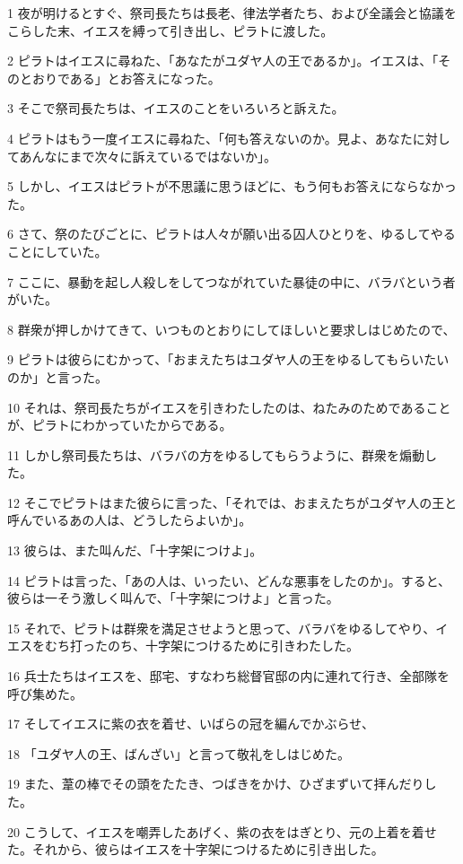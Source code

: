 \par 1 夜が明けるとすぐ、祭司長たちは長老、律法学者たち、および全議会と協議をこらした末、イエスを縛って引き出し、ピラトに渡した。
\par 2 ピラトはイエスに尋ねた、「あなたがユダヤ人の王であるか」。イエスは、「そのとおりである」とお答えになった。
\par 3 そこで祭司長たちは、イエスのことをいろいろと訴えた。
\par 4 ピラトはもう一度イエスに尋ねた、「何も答えないのか。見よ、あなたに対してあんなにまで次々に訴えているではないか」。
\par 5 しかし、イエスはピラトが不思議に思うほどに、もう何もお答えにならなかった。
\par 6 さて、祭のたびごとに、ピラトは人々が願い出る囚人ひとりを、ゆるしてやることにしていた。
\par 7 ここに、暴動を起し人殺しをしてつながれていた暴徒の中に、バラバという者がいた。
\par 8 群衆が押しかけてきて、いつものとおりにしてほしいと要求しはじめたので、
\par 9 ピラトは彼らにむかって、「おまえたちはユダヤ人の王をゆるしてもらいたいのか」と言った。
\par 10 それは、祭司長たちがイエスを引きわたしたのは、ねたみのためであることが、ピラトにわかっていたからである。
\par 11 しかし祭司長たちは、バラバの方をゆるしてもらうように、群衆を煽動した。
\par 12 そこでピラトはまた彼らに言った、「それでは、おまえたちがユダヤ人の王と呼んでいるあの人は、どうしたらよいか」。
\par 13 彼らは、また叫んだ、「十字架につけよ」。
\par 14 ピラトは言った、「あの人は、いったい、どんな悪事をしたのか」。すると、彼らは一そう激しく叫んで、「十字架につけよ」と言った。
\par 15 それで、ピラトは群衆を満足させようと思って、バラバをゆるしてやり、イエスをむち打ったのち、十字架につけるために引きわたした。
\par 16 兵士たちはイエスを、邸宅、すなわち総督官邸の内に連れて行き、全部隊を呼び集めた。
\par 17 そしてイエスに紫の衣を着せ、いばらの冠を編んでかぶらせ、
\par 18 「ユダヤ人の王、ばんざい」と言って敬礼をしはじめた。
\par 19 また、葦の棒でその頭をたたき、つばきをかけ、ひざまずいて拝んだりした。
\par 20 こうして、イエスを嘲弄したあげく、紫の衣をはぎとり、元の上着を着せた。それから、彼らはイエスを十字架につけるために引き出した。
